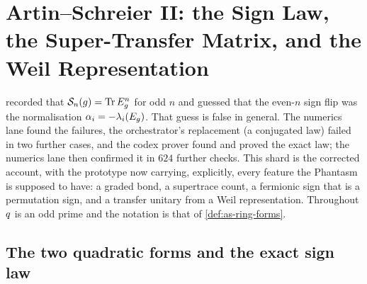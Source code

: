 
\section{Artin--Schreier II: the Sign Law, the Super-Transfer Matrix, and the Weil Representation}
\label{sec:artin-schreier-super}

 recorded that $\mathcal S_{n}(g) = \operatorname{Tr}E_g^n$ for odd $n$ and
guessed that the even-$n$ sign flip was the normalisation $\alpha_{i} = -\lambda_i(E_g)$.
That guess is false in general. The numerics lane found the failures, the orchestrator's
replacement (a conjugated law) failed in two further cases, and the codex prover found
and proved the exact law; the numerics lane then confirmed it in $624$ further checks.
This shard is the corrected account, with the prototype now carrying, explicitly, every
feature the Phantasm is supposed to have: a graded bond, a supertrace count, a fermionic
sign that is a permutation sign, and a transfer unitary from a Weil representation.
Throughout $q$ is an odd prime and the notation is that of \cref{def:as-ring-forms}.

\subsection{The two quadratic forms and the exact sign law}

